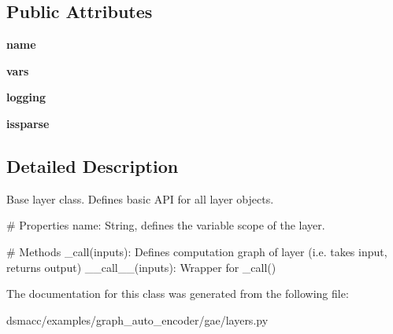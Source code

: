 \subsection*{Public Attributes}
\begin{DoxyCompactItemize}
\item 
\mbox{\label{classdsmacc_1_1examples_1_1graph__auto__encoder_1_1gae_1_1layers_1_1Layer_a60c0fca3da4fc19b0aa6e14d9eb8d28a}} 
{\bfseries name}
\item 
\mbox{\label{classdsmacc_1_1examples_1_1graph__auto__encoder_1_1gae_1_1layers_1_1Layer_a771f1a97abbccc00be0f3f2b52b5b565}} 
{\bfseries vars}
\item 
\mbox{\label{classdsmacc_1_1examples_1_1graph__auto__encoder_1_1gae_1_1layers_1_1Layer_a517897b7ffeb21279638b1a75abb3cec}} 
{\bfseries logging}
\item 
\mbox{\label{classdsmacc_1_1examples_1_1graph__auto__encoder_1_1gae_1_1layers_1_1Layer_af37d9e315a8a90d05d4fa3507938a604}} 
{\bfseries issparse}
\end{DoxyCompactItemize}


\subsection{Detailed Description}
\begin{DoxyVerb}Base layer class. Defines basic API for all layer objects.

# Properties
    name: String, defines the variable scope of the layer.

# Methods
    _call(inputs): Defines computation graph of layer
        (i.e. takes input, returns output)
    __call__(inputs): Wrapper for _call()
\end{DoxyVerb}
 

The documentation for this class was generated from the following file\+:\begin{DoxyCompactItemize}
\item 
dsmacc/examples/graph\+\_\+auto\+\_\+encoder/gae/layers.\+py\end{DoxyCompactItemize}

